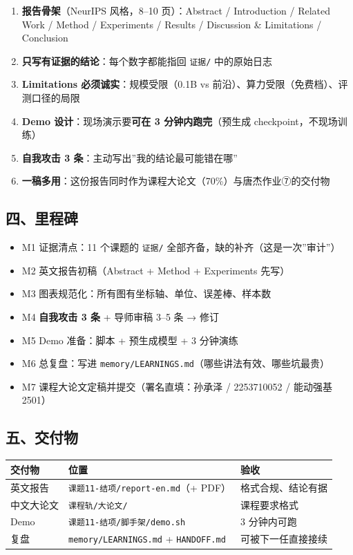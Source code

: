 \documentclass[
  chinese,
  11pt,
]{ctexart}
\newcounter{none} %
\providecommand{\tightlist}{%
  \setlength{\itemsep}{0pt}\setlength{\parskip}{0pt}}
\begin{document}
\begin{enumerate}
\def\labelenumi{\arabic{enumi}.}
\tightlist
\item
  \textbf{报告骨架}（NeurIPS 风格，8--10 页）：Abstract / Introduction / Related Work / Method / Experiments / Results / Discussion \& Limitations / Conclusion
\item
  \textbf{只写有证据的结论}：每个数字都能指回 \texttt{证据/} 中的原始日志
\item
  \textbf{Limitations 必须诚实}：规模受限（0.1B vs 前沿）、算力受限（免费档）、评测口径的局限
\item
  \textbf{Demo 设计}：现场演示要\textbf{可在 3 分钟内跑完}（预生成 checkpoint，不现场训练）
\item
  \textbf{自我攻击 3 条}：主动写出''我的结论最可能错在哪''
\item
  \textbf{一稿多用}：这份报告同时作为课程大论文（70\%）与唐杰作业⑦的交付物
\end{enumerate}

\subsection{四、里程碑}\label{ux56dbux91ccux7a0bux7891}

\begin{itemize}
\tightlist
\item[$\square$]
  M1 证据清点：11 个课题的 \texttt{证据/} 全部齐备，缺的补齐（这是一次''审计''）
\item[$\square$]
  M2 英文报告初稿（Abstract + Method + Experiments 先写）
\item[$\square$]
  M3 图表规范化：所有图有坐标轴、单位、误差棒、样本数
\item[$\square$]
  M4 \textbf{自我攻击 3 条} + 导师审稿 3--5 条 → 修订
\item[$\square$]
  M5 Demo 准备：脚本 + 预生成模型 + 3 分钟演练
\item[$\square$]
  M6 总复盘：写进 \texttt{memory/LEARNINGS.md}（哪些讲法有效、哪些坑最贵）
\item[$\square$]
  M7 课程大论文定稿并提交（署名直填：孙承泽 / 2253710052 / 能动强基2501）
\end{itemize}

\subsection{五、交付物}\label{ux4e94ux4ea4ux4ed8ux7269}

{\def\LTcaptype{none} %
\begin{longtable}[]{@{}lll@{}}
\toprule\noalign{}
交付物 & 位置 & 验收 \\
\midrule\noalign{}
\endhead
\bottomrule\noalign{}
\endlastfoot
英文报告 & \texttt{课题11-结项/report-en.md}（+ PDF） & 格式合规、结论有据 \\
中文大论文 & \texttt{课程轨/大论文/} & 课程要求格式 \\
Demo & \texttt{课题11-结项/脚手架/demo.sh} & 3 分钟内可跑 \\
复盘 & \texttt{memory/LEARNINGS.md} + \texttt{HANDOFF.md} & 可被下一任直接接续 \\
\end{longtable}
}
\end{document}
